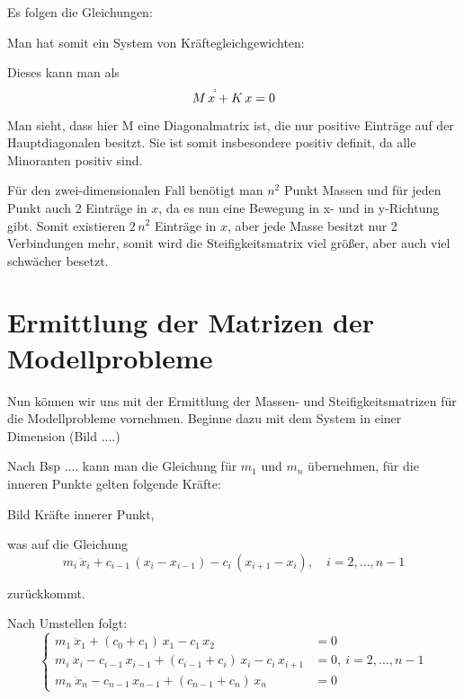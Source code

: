 \documentclass[ngerman,BCOR=4mm]{tudscrreprt}
\theoremstyle{plain} %
\theoremstyle{definition} %
\theoremstyle{remark}
\begin{document}
            Es folgen die Gleichungen:



            Man hat somit ein System von Kräftegleichgewichten:

            Dieses kann man als
            \begin{equation}
                  \label{eqn: MK Gleichung in 1D}
                  M\,x^{\dot\dot} + K\,x = 0
            \end{equation}

            Man sieht, dass hier M eine Diagonalmatrix ist, die nur positive Einträge auf der Hauptdiagonalen besitzt.
            Sie ist somit insbesondere positiv definit, da alle Minoranten positiv sind.

            Für den zwei-dimensionalen Fall benötigt man $n^2$ Punkt Massen und für jeden Punkt auch 2 Einträge in $x$, da es nun eine Bewegung in x- und in y-Richtung gibt.
            Somit existieren $2\,n^2$ Einträge in $x$, aber jede Masse besitzt nur 2 Verbindungen mehr, somit wird die Steifigkeitsmatrix \K viel größer, aber auch viel schwächer besetzt.
            
      \section{Ermittlung der Matrizen der Modellprobleme}
            Nun können wir uns mit der Ermittlung der Massen- und Steifigkeitsmatrizen für die Modellprobleme vornehmen.
            Beginne dazu mit dem System in einer Dimension (Bild ....)

            Nach Bsp .... kann man die Gleichung für $m_1$ und $m_n$ übernehmen, für die inneren Punkte gelten folgende Kräfte:

            Bild Kräfte innerer Punkt,

            was auf die Gleichung
            $$m_i\,\ddot x_i + c_{i-1}\,(x_i-x_{i-1}) - c_i\,(x_{i+1}-x_i), \quad i=2,...,n-1$$

            zurückkommt. 

            Nach Umstellen folgt:
            \begin{equation}
                  \label{eqn: System GDgl MK 1d}
                  \begin{cases}
                        m_1\ \ddot x_1 + (c_0+c_1)\,x_1 - c_1\,x_2 & = 0   \\
                        m_i\ \ddot x_i - c_{i-1}\,x_{i-1} + (c_{i-1}+c_i)\,x_i -c_i\,x_{i+1} & = 0,\ i=2,...,n-1 \\
                        m_n\ \ddot x_n - c_{n-1}\,x_{n-1} + (c_{n-1}+c_n)\,x_n & = 0
                  \end{cases}
            \end{equation}
\end{document}
